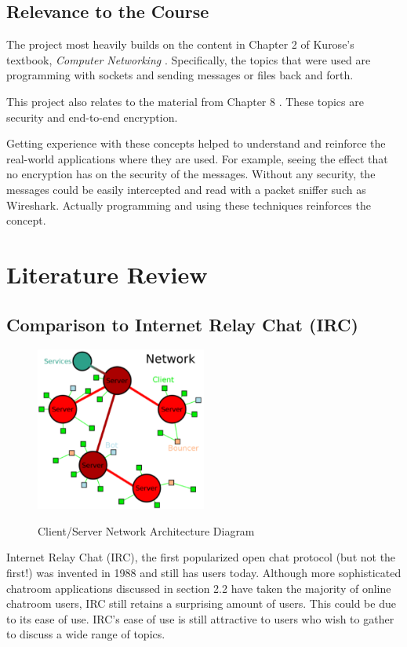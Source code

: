 \documentclass{article}
\begin{document}
\subsection{Relevance to the Course}

The project most heavily builds on the content in Chapter 2 of Kurose's textbook, \emph{Computer Networking} \cite{kurose}. Specifically, the topics that were used are programming with sockets and sending messages or files back and forth. 

This project also relates to the material from Chapter 8 \cite{kurose}. These topics are security and end-to-end encryption. 

Getting experience with these concepts helped to understand and reinforce the real-world applications where they are used. For example, seeing the effect that no encryption has on the security of the messages. Without any security, the messages could be easily intercepted and read with a packet sniffer such as Wireshark. Actually programming and using these techniques reinforces the concept.

\section{Literature Review}

\subsection{Comparison to Internet Relay Chat (IRC)}

\begin{figure}[h]
\caption{Client/Server Network Architecture Diagram}
\centering
\includegraphics[width=0.5\textwidth]{media/Network.PNG}
\label{Network Architecture}
\end{figure}

Internet Relay Chat (IRC), the first popularized open chat protocol (but not the first!) was invented in 1988 and still has users today. Although more sophisticated chatroom applications discussed in section 2.2 have taken the majority of online chatroom users, IRC still retains a surprising amount of users. This could be due to its ease of use. IRC's ease of use is still attractive to users who wish to gather to discuss a wide range of topics. 
\end{document}
